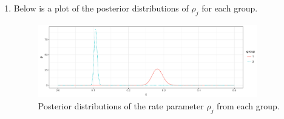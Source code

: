 \documentclass[12pt]{article}
\begin{document}
\begin{enumerate}
\begin{enumerate}
      \item Below is a plot of the posterior distributions of $\rho_j$ for each group.

        \begin{figure}[h!]
          \centering
          \includegraphics[width=0.9\textwidth]{./figures/exam02.pdf}
          \caption{Posterior distributions of the rate parameter $\rho_j$ from each group.}
          \label{fig:1}
        \end{figure}
    \end{enumerate}
\end{enumerate}
\end{document}
